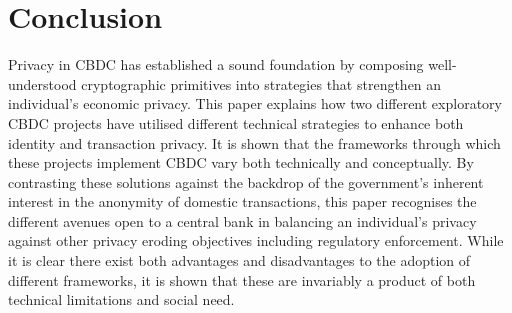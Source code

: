 \section{Conclusion}

Privacy in CBDC has established a sound foundation by composing well-understood cryptographic primitives into strategies that strengthen an individual's economic privacy. This paper explains how two different exploratory CBDC projects have utilised different technical strategies to enhance both identity and transaction privacy. It is shown that the frameworks through which these projects implement CBDC vary both technically and conceptually. By contrasting these solutions against the backdrop of the government's inherent interest in the anonymity of domestic transactions, this paper recognises the different avenues open to a central bank in balancing an individual's privacy against other privacy eroding objectives including regulatory enforcement. While it is clear there exist both advantages and disadvantages to the adoption of different frameworks, it is shown that these are invariably a product of both technical limitations and social need.
